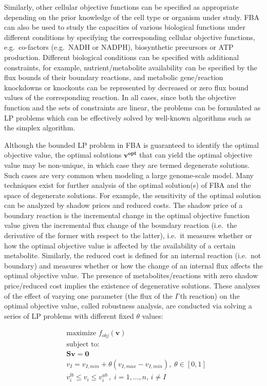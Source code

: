 \documentclass[12pt,twoside,openany,\mydriver]{thesis}  %
\begin{document}
Similarly, other cellular objective functions can be specified as appropriate depending on the prior knowledge of the cell type or organism under study. FBA can also be used to study the capacities of various biological functions under different conditions by specifying the corresponding cellular objective functions, e.g.~co-factors (e.g.~NADH or NADPH), biosynthetic precursors or ATP production. Different biological conditions can be specified with additional constraints, for example, nutrient/metabolite availability can be specified by the flux bounds of their boundary reactions, and metabolic gene/reaction knockdowns or knockouts can be represented by decreased or zero flux bound values of the corresponding reaction. In all cases, since both the objective function and the sets of constraints are linear, the problems can be formulated as LP problems which can be effectively solved by well-known algorithms such as the simplex algorithm.

Although the bounded LP problem in FBA is guaranteed to identify the optimal objective value, the optimal solutions \(\mathbf{v^{opt}}\) that can yield the optimal objective value may be non-unique, in which case they are termed degenerate solutions. Such cases are very common when modeling a large genome-scale model. Many techniques exist for further analysis of the optimal solution(s) of FBA and the space of degenerate solutions. For example, the sensitivity of the optimal solution can be analyzed by shadow prices and reduced costs. The shadow price of a boundary reaction is the incremental change in the optimal objective function value given the incremental flux change of the boundary reaction (i.e.~the derivative of the former with respect to the latter), i.e.~it measures whether or how the optimal objective value is affected by the availability of a certain metabolite. Similarly, the reduced cost is defined for an internal reaction (i.e.~not boundary) and measures whether or how the change of an internal flux affects the optimal objective value. The presence of metabolites/reactions with zero shadow price/reduced cost implies the existence of degenerative solutions. These analyses of the effect of varying one parameter (the flux of the \(I\)'th reaction) on the optimal objective value, called robustness analysis, are conducted via solving a series of LP problems with different fixed \(\theta\) values:

\[
\begin{aligned}
&\text{maximize } f_{obj}(\mathbf{v}) \\
&\text{subject to:} \\
&\mathbf{Sv = 0} \\
&v_I = v_{I,min} + \theta (v_{I,max}-v_{I,min}),\; \theta \in [0,1]\\
&v^{lb}_{i} \le v_i \le v^{ub}_{i}\, ,\; i=1,...,n,\, i\neq I\\
\end{aligned}
\]
\end{document}
